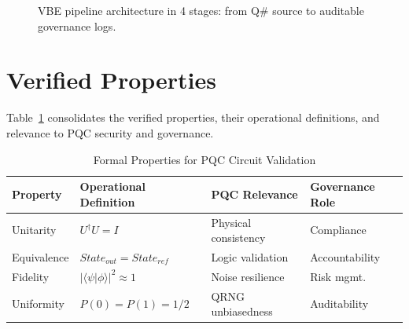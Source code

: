 \documentclass[journal]{IEEEtran} %
\begin{document}
\begin{figure}[!t]
\centering
{}
\caption{VBE pipeline architecture in 4 stages: from Q\# source to auditable governance logs.}
\label{fig:pipeline}
\end{figure}

\section{Verified Properties}
Table~\ref{tab:properties} consolidates the verified properties, their operational definitions, and relevance to PQC security and governance.

\begin{table}[!t]
\centering
\caption{Formal Properties for PQC Circuit Validation}
\label{tab:properties}
\footnotesize
\begin{tabularx}{\columnwidth}{@{}l>{\raggedright\arraybackslash}X>{\raggedright\arraybackslash}X>{\raggedright\arraybackslash}X@{}}
\toprule
\textbf{Property} & \textbf{Operational Definition} & \textbf{PQC Relevance} & \textbf{Governance Role} \\
\midrule
Unitarity & $U^\dagger U = I$ & Physical consistency & Compliance \\
Equivalence & $State_{out} = State_{ref}$ & Logic validation & Accountability \\
Fidelity & $|\langle \psi | \phi \rangle|^2 \approx 1$ & Noise resilience & Risk mgmt. \\
Uniformity & $P(0) = P(1) = 1/2$ & QRNG unbiasedness & Auditability \\
\bottomrule
\end{tabularx}
\end{table}
\end{document}
